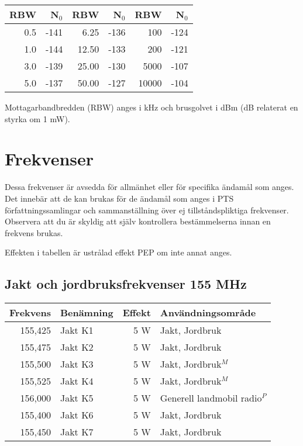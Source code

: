 \begin{center}
\begin{tabular}{rr|rr|rr}
	\textbf{RBW} & \textbf{N$_0$} & \textbf{RBW} & \textbf{N$_0$} & \textbf{RBW} & \textbf{N$_0$} \\ \hline
	         0.5 &           -141 &         6.25 &           -136 &          100 &           -124 \\
	         1.0 &           -144 &        12.50 &           -133 &          200 &           -121 \\
	         3.0 &           -139 &        25.00 &           -130 &         5000 &           -107 \\
	         5.0 &           -137 &        50.00 &           -127 &        10000 &           -104
\end{tabular}
\end{center}

Mottagarbandbredden (RBW) anges i kHz och brusgolvet i dBm (dB relaterat en styrka om 1 mW).

\section{Frekvenser}

Dessa frekvenser är avsedda för allmänhet eller för specifika ända\-mål som anges. Det innebär att de kan brukas för de ändamål som anges i PTS för\-fatt\-nings\-sam\-ling\-ar och sammanställning över ej tillståndspliktiga frekvenser. Observera att du är skyldig att själv kontrollera bestämmelserna innan en frekvens brukas.

Effekten i tabellen är ustrålad effekt PEP om inte annat anges.

\subsection{Jakt och jordbruksfrekvenser 155 MHz}
\begin{tabular}{rlrl}
	\textbf{Frekvens} & \textbf{Benämning} & \textbf{Effekt} & \textbf{Användningsområde} \\ \hline
	          155,425 & Jakt K1            &             5 W & Jakt, Jordbruk         \\
	          155,475 & Jakt K2            &             5 W & Jakt, Jordbruk         \\
	          155,500 & Jakt K3            &             5 W & Jakt, Jordbruk$^M$         \\
	          155,525 & Jakt K4            &             5 W & Jakt, Jordbruk$^M$         \\
	          156,000 & Jakt K5            &             5 W & Generell landmobil radio$^P$       \\
	          155,400 & Jakt K6            &             5 W & Jakt, Jordbruk         \\
	          155,450 & Jakt K7            &             5 W & Jakt, Jordbruk
\end{tabular}


